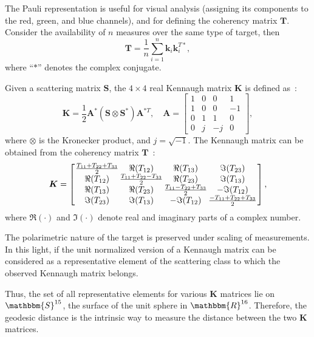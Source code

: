 \documentclass[journal]{IEEEtran}
\begin{document}
	The Pauli representation is useful for visual analysis (assigning its components to the red, green, and blue channels), and for defining the coherency matrix $\bm T$.
	Consider the availability of $n$ measures over the same type of target, then
	$$
	\bm T = \frac{1}{n} \sum_{i=1}^{n}\bm k_i \bm k_i^{T*},
	$$
	where ``$*$'' denotes the complex conjugate.
	
	Given a scattering matrix $\bm{S}$, the $4 \times 4$ real Kennaugh matrix $\bm{K}$ is defined as~\cite{Pottier09}:
	\begin{equation}
		\bm{K} = \frac{1}{2}\bm{A}^*(\bm{S} \otimes \bm{S}^*) \bm{A}^{*T}, \quad \bm{A} = \left[
		\begin{array}{cccc}
			1 & 0 & 0 & 1\\
			1 & 0 & 0 & -1\\
			0 & 1 & 1 & 0\\
			0 & j & -j & 0
		\end{array}\right],
	\end{equation}
	where $\otimes$ is the Kronecker product, and  $j = \sqrt{-1}$.
	The Kennaugh matrix can be obtained from the coherency matrix $\bm{T}$~\cite{PolarisationApplicationsRemoteSensing}:
	\begin{equation}
		\label{incoKen}
		\bm{K} =
		\left[\arraycolsep=.7pt
		\begin{array}{cccc}
			\frac{T_{11}+T_{22}+ T_{33}}{2} & \Re(T_{12}) & \Re(T_{13}) & \Im(T_{23})\\
			\Re(T_{12}) & \frac{T_{11}+T_{22}-T_{33}}{2} & \Re(T_{23}) & \Im(T_{13})\\
			\Re(T_{13}) & \Re(T_{23}) & \frac{T_{11}-T_{22}+T_{33}}{2} & - \Im(T_{12})\\
			\Im(T_{23}) & \Im(T_{13}) & - \Im(T_{12}) &\frac{-T_{11}+T_{22}+T_{33}}{2}
		\end{array}\right],
	\end{equation}
	where $\Re(\cdot)$ and $\Im(\cdot)$ denote real and imaginary parts of a complex number. 
	
	The polarimetric nature of the target is preserved under scaling of measurements. In this light, if the unit normalized version of a Kennaugh matrix can be considered as a representative element of the scattering class to which the observed Kennaugh matrix belongs.%
	
	Thus, the set of all representative elements for various $\bm{K}$ matrices lie on $\mathbbm{S}^{15}$, the surface of the unit sphere in $\mathbbm{R}^{16}$. 
	Therefore, the geodesic distance is the intrinsic way to measure the distance between the two $\bm{K}$ matrices.
	
\end{document}
